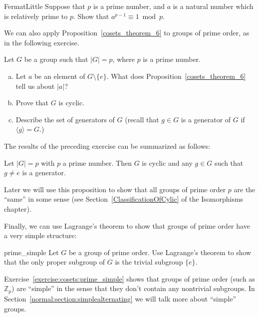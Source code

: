 {\begin{exercise}{FermatLittle}
Suppose that $p$ is a prime number, and $a$ is a natural number which is relatively prime to $p$. Show that  $a^{p-1} \equiv 1 \bmod{p}$.
\end{exercise}

We can also apply Proposition~\ref{cosets_theorem_6} to groups of prime order, as in the following exercise.

\begin{exercise}{}
Let $G$ be a group such that $|G| = p$, where $p$ is a prime number.
\begin{enumerate}[(a)]
\item
Let $a$ be an element of $G \setminus \{e\}$.  What does Proposition~\ref{cosets_theorem_6} tell us about $|a|$?
\item
Prove that $G$ is cyclic.
\item
Describe the set of generators of $G$  (recall that $g \in G$ is a generator of $G$ if $\langle g \rangle = G$.)
\end{enumerate}
\end{exercise}

The results of the preceding exercise can be summarized as follows:

\begin{thm}\label{cosets_theorem_7}
Let $|G| = p$ with $p$ a prime number.  Then $G$ is cyclic and any $g \in G$ such that $g \neq e$ is a generator. 
\end{thm}
Later we will use this proposition to show that all groups of  prime order $p$  are the ``same'' in some sense (see Section~\ref{ClassificationOfCylic} of the Isomorphisms chapter).

Finally, we can use Lagrange's theorem to show that groups of prime order have a very simple structure:
 
\begin{exercise}{prime_simple}
Let $G$ be a group of prime order. Use Lagrange's theorem to show that the only proper subgroup of $G$ is the trivial subgroup $\{e\}$.
\end{exercise}

Exercise~\ref{exercise:cosets:prime_simple} shows that groups of prime order (such as ${\mathbb Z}_p$)  are ``simple'' in the sense that they don't contain any nontrivial subgroups. In Section~\ref{normal:section:simplealternating} we will talk more about ``simple'' groups.


}
